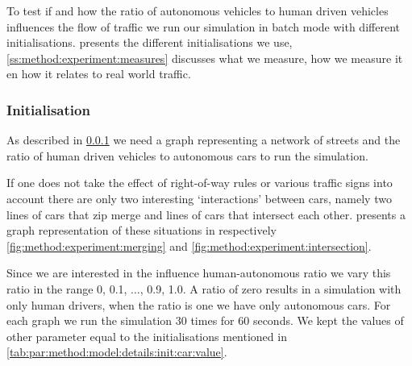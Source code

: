 To test if and how the ratio of autonomous vehicles to human driven vehicles influences the flow of traffic we run our simulation in batch mode with different initialisations.  presents the different initialisations we use, \cref{ss:method:experiment:measures} discusses what we measure, how we measure it en how it relates to real world traffic. 

\subsubsection{Initialisation}
\label{ss:method:experiment:init}
As described in \cref{ss:method:experiment:init} we need a graph representing a network of streets and the ratio of human driven vehicles to autonomous cars to run the simulation. 

If one does not take the effect of right-of-way rules or various traffic signs into account there are only two interesting `interactions' between cars, namely two lines of cars that zip merge and lines of cars that intersect each other.  presents a graph representation of these situations in respectively \cref{fig:method:experiment:merging} and \cref{fig:method:experiment:intersection}.

Since we are interested in the influence human-autonomous ratio we vary this ratio in the range 0, 0.1, $\dotsc$, 0.9, 1.0. A ratio of zero results in a simulation with only human drivers, when the ratio is one we have only autonomous cars. For each graph we run the simulation 30 times for 60 seconds. We kept the values of other parameter equal to the initialisations mentioned in \cref{tab:par:method:model:details:init:car:value}.

